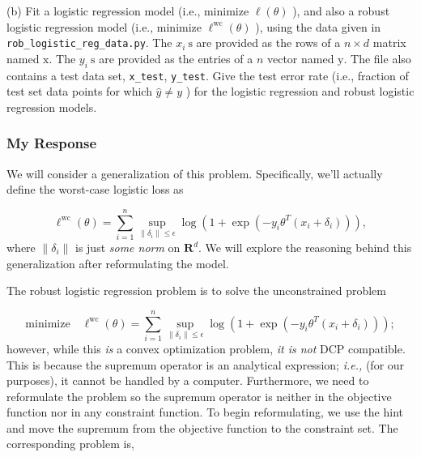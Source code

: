 \documentclass[12pt,reqno]{article}
\theoremstyle{definition}
\numberwithin{equation}{section}
\begin{document}
\vspace{0.1cm}
\noindent (b) Fit a logistic regression model (i.e., minimize $\ell(\theta)$ ), and also a robust logistic regression model
(i.e., minimize $\ell^{\mathrm{wc}}(\theta)$ ), using the data given in \lstinline|rob_logistic_reg_data.py|.
The $x_i \mathrm{~s}$ are provided as the rows of a $n \times d$ matrix named $\mathrm{x}$.
The $y_i \mathrm{~s}$ are provided as the entries of a $n$ vector named $\mathrm{y}$.
The file also contains a test data set, \lstinline|x_test|, \lstinline|y_test|. Give the test error rate (i.e., fraction of test set data points for which $\hat{y} \neq y$ )
for the logistic regression and robust logistic regression models.

\subsubsection*{My Response}

\noindent We will consider a generalization of this problem. Specifically, we'll actually define the worst-case logistic loss as

\[
\ell^{\mathrm{wc}}(\theta)=\sum_{i=1}^n \sup _{\left\|\delta_i\right\| \leq \epsilon} \log \left(1+\exp \left(-y_i \theta^T\left(x_i+\delta_i\right)\right)\right),
\]
where $\left\lVert \delta_i \right\rVert$ is just \textit{some norm} on $\mathbf{R}^{d}$. We will explore the reasoning behind
this generalization after reformulating the model.

\noindent The robust logistic regression problem is to solve the unconstrained problem

\[\mathrm{minimize} \quad \ell^{\mathrm{wc}}(\theta)=\sum_{i=1}^n \sup _{\left\|\delta_i\right\| \leq \epsilon} \log \left(1+\exp \left(-y_i \theta^T\left(x_i+\delta_i\right)\right)\right);\]
however, while this \textit{is} a convex optimization problem, \textit{it is not} DCP compatible. This is because
the supremum operator is an analytical expression; \textit{i.e.,} (for our purposes), it cannot be handled by a computer.
Furthermore, we need to reformulate the problem so the supremum operator is neither in the objective function nor in any
constraint function. To begin reformulating, we use the hint and move the supremum from the objective function
to the constraint set. The corresponding problem is,
\end{document}
